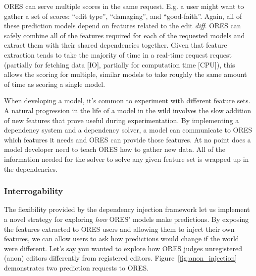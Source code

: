ORES can serve multiple scores in the same request.  E.g. a user might want to gather a set of scores: ``edit type'', ``damaging'', and ``good-faith''.  Again, all of these prediction models depend on features related to the edit \emph{diff}.  ORES can safely combine all of the features required for each of the requested models and extract them with their shared dependencies together.  Given that feature extraction tends to take the majority of time in a real-time request request (partially for fetching data [IO], partially for computation time [CPU]), this allows the scoring for multiple, similar models to take roughly the same amount of time as scoring a single model.

When developing a model, it's common to experiment with different feature sets.  A natural progression in the life of a model in the wild involves the slow addition of new features that prove useful during experimentation.  By implementing a dependency system and a dependency solver, a model can communicate to ORES which features it needs and ORES can provide those features.  At no point does a model developer need to teach ORES how to gather new data.  All of the information needed for the solver to solve any given feature set is wrapped up in the dependencies.

\subsubsection{Interrogability}
The flexibility provided by the dependency injection framework let us implement a novel strategy for exploring \emph{how} ORES' models make predictions.  By exposing the features extracted to ORES users and allowing them to inject their own features, we can allow users to ask how predictions would change if the world were different.  Let's say you wanted to explore how ORES judges unregistered (anon) editors differently from registered editors.  Figure~\ref{fig:anon_injection} demonstrates two prediction requests to ORES.

